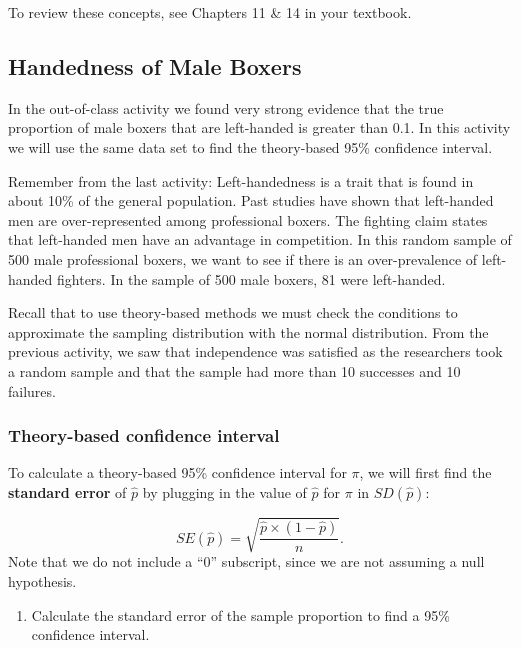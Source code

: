 \documentclass[
]{report}
\providecommand{\tightlist}{%
  \setlength{\itemsep}{0pt}\setlength{\parskip}{0pt}}
\begin{document}
To review these concepts, see Chapters 11 \& 14 in your textbook.

\hypertarget{handedness-of-male-boxers-1}{%
\subsection{Handedness of Male Boxers}\label{handedness-of-male-boxers-1}}

In the out-of-class activity we found very strong evidence that the true proportion of male boxers that are left-handed is greater than 0.1. In this activity we will use the same data set to find the theory-based 95\% confidence interval.

Remember from the last activity: Left-handedness is a trait that is found in about 10\% of the general population. Past studies have shown that left-handed men are over-represented among professional boxers. The fighting claim states that left-handed men have an advantage in competition. In this random sample of 500 male professional boxers, we want to see if there is an over-prevalence of left-handed fighters. In the sample of 500 male boxers, 81 were left-handed.

Recall that to use theory-based methods we must check the conditions to approximate the sampling distribution with the normal distribution. From the previous activity, we saw that independence was satisfied as the researchers took a random sample and that the sample had more than 10 successes and 10 failures.

\hypertarget{theory-based-confidence-interval}{%
\subsubsection*{Theory-based confidence interval}\label{theory-based-confidence-interval}}

To calculate a theory-based 95\% confidence interval for \(\pi\), we will first find the \textbf{standard error} of \(\hat{p}\) by plugging in the value of \(\hat{p}\) for \(\pi\) in \(SD(\hat{p})\):

\[SE(\hat{p}) = \sqrt{\frac{\hat{p}\times (1-\hat{p})}{n}}.\]
Note that we do not include a ``0'' subscript, since we are not assuming a null hypothesis.

\begin{enumerate}
\def\labelenumi{\arabic{enumi}.}
\tightlist
\item
  Calculate the standard error of the sample proportion to find a 95\% confidence interval.
\end{enumerate}
\end{document}
